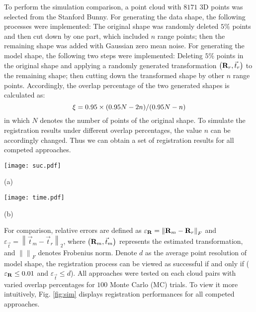 \documentclass[review]{elsarticle}
\begin{document}
To perform the simulation comparison, a point cloud with $8171$ 3D points was selected from the Stanford Bunny. For generating the data shape, the following processes were implemented: The original shape was randomly deleted $5\% $ points and then cut down by one part, which included $n$ range points; then the remaining shape was added with Gaussian zero mean noise. For generating the model shape, the following two steps were implemented: Deleting $5\% $ points in the original shape and applying a randomly generated transformation $\left( {{{\bf{R}}_r},{{\vec t }_r}} \right)$ to the remaining shape; then cutting down the transformed shape by other $n$ range points. Accordingly, the overlap percentage of the two generated shapes is calculated as:
\begin{equation}
\xi  = {{0.95 \times \left( {0.95N - 2n} \right)} \mathord{\left/
 {\vphantom {{0.95 \times \left( {0.95N - 2n} \right)} {\left( {0.95N - n} \right)}}} \right.
 \kern-\nulldelimiterspace} {\left( {0.95N - n} \right)}}
\end{equation}
in which $N$ denotes the number of points of the original shape. To simulate the registration results under different overlap percentages, the value $n$ can be accordingly changed. Thus we can obtain a set of registration results for all competed approaches.


\begin{figure*}[!t]
\begin{minipage}[b]{.5\linewidth}
  \centering
  \centerline{\texttt{[image: suc.pdf]}}
  \centerline{(a)}
\end{minipage}
\hfill
\begin{minipage}[b]{0.5\linewidth}
  \centering
  \centerline{\texttt{[image: time.pdf]}}
  \centerline{(b)}
\end{minipage}

\caption{ Performance comparison under varied overlap percentages. (a) Success rate. (b) Average runtime.}\medskip
\label{fig:sim}
\end{figure*}


For comparison, relative errors are defined as ${\varepsilon _{\bf{R}}} = {\left\| {{{\bf{R}}_m} - {{\bf{R}}_r}} \right\|_F}$ and ${\varepsilon _{\vec t }} = {\left\| {{{\vec t }_m} - {{\vec t }_r}} \right\|_2}$, where $\left( {{{\bf{R}}_m},{{\vec t }_m}} \right)$  represents the estimated transformation, and ${\left\| {} \right\|_F}$ denotes Frobenius norm. Denote $d$ as the average point resolution of model shape, the registration process can be viewed as successful if and only if (${\varepsilon _{\bf{R}}} \le 0.01$ and ${\varepsilon _{\vec t }} \le d$). All approaches were tested on each cloud pairs with varied overlap percentages for $100$ Monte Carlo (MC) trials. To view it more intuitively, Fig. \ref{fig:sim} displays registration performances for all competed approaches.
\end{document}
